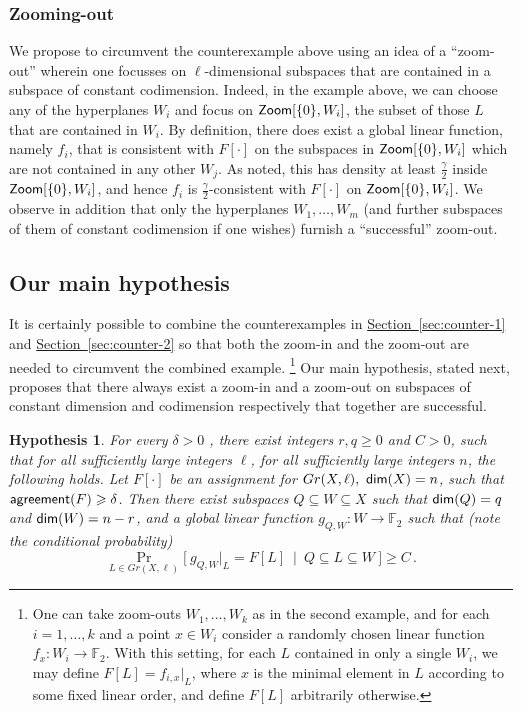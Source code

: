 \documentclass[11pt]{article}
\numberwithin{equation}{section}
\theoremstyle{definition}
\theoremstyle{plain}
\newcommand{\expref}[2]{\hyperref[#2]{#1~\ref{#2}}}
\newtheorem{conj}[theorem]{Hypothesis}
\newcommand\bProb[2]{{\Pr_{#1}\big[ {#2} \big]}}
\newcommand*\dimm{{\sf dim}}
\renewcommand\geq{\geqslant}
\renewcommand\ge{\geqslant}
\renewcommand\subset{\subseteq}
\newcommand{\Zoom}{{\sf Zoom}}
\def\F{\mathbb{F}}
\def\agr{{\sf agreement}}
\begin{document}
\subsubsection*{Zooming-out}

We propose to circumvent the counterexample above using an idea of a
``zoom-out'' wherein one focusses on $\ell$-dimensional subspaces that
are contained in a subspace of constant codimension. Indeed, in the
example above, we can choose any of the hyperplanes $W_i$ and focus on
${\Zoom}[\{0\}, W_i]$, the subset of those $L$ that are contained
in $W_i$. By definition, there does exist a global linear function,
namely $f_i$, that is consistent with $F[\cdot]$ on the subspaces in
${\Zoom}[\{0\}, W_i]$ which are not contained in any other
$W_j$. As noted, this has density at least $\frac{\gamma}{2}$ inside
${\Zoom}[\{0\}, W_i]$, and hence $f_i$ is
$\frac{\gamma}{2}$-consistent with $F[\cdot]$ on
${\Zoom}[\{0\}, W_i]$. We observe in addition that only the
hyperplanes $W_1, \ldots, W_m$ (and further subspaces of them of
constant codimension if one wishes) furnish a ``successful'' zoom-out.

\subsection{Our main hypothesis}

 It is certainly possible to combine the counterexamples
 in \expref{Section}{sec:counter-1} and \expref{Section}{sec:counter-2} so
 that both the zoom-in and the zoom-out are needed to circumvent the
 combined example. \footnote{One can take zoom-outs $W_1,\ldots,W_k$ as
 in the second example, and for each $i=1,\ldots,k$ and a point $x\in W_{i}$ consider
 a randomly chosen linear function $f_x\colon W_i\to\mathbb{F}_2$. With this setting,
 for each $L$ contained in only a single $W_i$, we may define $F[L] = f_{i,x}|_{L}$, where
 $x$ is the minimal element in $L$ according to some fixed linear order, and define $F[L]$ arbitrarily otherwise.}
 Our main hypothesis, stated next, proposes that
 there always exist a zoom-in and a zoom-out on subspaces of constant
 dimension and codimension respectively that together are successful.


\begin{conj}\label{conj:main}
  For every
  $\delta > 0$ , there exist integers
  $r,q \geq 0$ %
  and  %
  $C > 0$, such that for all sufficiently large integers $\ell$, for all sufficiently large integers $n$,  the following holds.
  Let $F[\cdot]$ be an assignment for $Gr(X,\ell), ~{\sf dim}(X) = n$, such that $\agr(F)\ge \delta$.
  Then there exist subspaces $Q\subset W \subset X$ such that $\dimm(Q)=q$ and $\dimm(W) = n-r$, and a
  global linear function $g_{Q,W}: W \to \F_2$ such that (note the conditional probability)
  \begin{equation} \label{eqn:global-fn}
  \bProb{L \in Gr(X, \ell)}{~g_{Q,W}|_L = F[L]  ~\mid  ~Q \subseteq L \subseteq W~}\geqslant C \,.
  \end{equation}
\end{conj}
\end{document}
